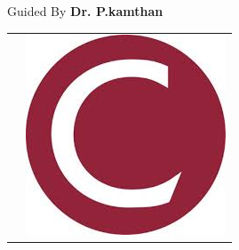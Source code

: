 \documentclass[final]{beamer}
\newlength{\sepwid}
\newlength{\onecolwid}
\begin{document}
\begin{frame}
\begin{columns}[t]
\begin{column}{\onecolwid}
\begin{block}{Guided By}
\textbf{ Dr. P.kamthan}
\end{block}
\begin{tabular}{rr}
\hspace{0.5\linewidth} & \includegraphics[width=0.4\linewidth]{Concordia-Logo1.jpg}
\end{tabular}


\end{column} %

\begin{column}{\sepwid}\end{column} %

\end{columns} %

\end{frame} %
\end{document}
